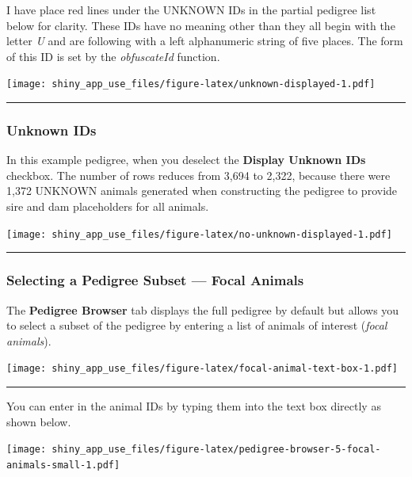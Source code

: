 \documentclass[
]{article}
\begin{document}
I have place red lines under the UNKNOWN IDs in the partial pedigree
list below for clarity. These IDs have no meaning other than they all
begin with the letter \emph{U} and are following with a left
alphanumeric string of five places. The form of this ID is set by the
\emph{obfuscateId} function.

\texttt{[image: shiny\_app\_use\_files/figure-latex/unknown-displayed-1.pdf]}

\begin{center}\rule{0.5\linewidth}{\linethickness}\end{center}

\hypertarget{unknown-ids}{%
\subsubsection{Unknown IDs}\label{unknown-ids}}

In this example pedigree, when you deselect the \textbf{Display Unknown
IDs} checkbox. The number of rows reduces from 3,694 to 2,322, because
there were 1,372 UNKNOWN animals generated when constructing the
pedigree to provide sire and dam placeholders for all animals.

\texttt{[image: shiny\_app\_use\_files/figure-latex/no-unknown-displayed-1.pdf]}

\begin{center}\rule{0.5\linewidth}{\linethickness}\end{center}

\hypertarget{selecting-a-pedigree-subset-focal-animals}{%
\subsubsection{Selecting a Pedigree Subset --- Focal
Animals}\label{selecting-a-pedigree-subset-focal-animals}}

The \textbf{Pedigree Browser} tab displays the full pedigree by default
but allows you to select a subset of the pedigree by entering a list of
animals of interest (\emph{focal animals}).

\texttt{[image: shiny\_app\_use\_files/figure-latex/focal-animal-text-box-1.pdf]}

\begin{center}\rule{0.5\linewidth}{\linethickness}\end{center}

You can enter in the animal IDs by typing them into the text box
directly as shown below.

\texttt{[image: shiny\_app\_use\_files/figure-latex/pedigree-browser-5-focal-animals-small-1.pdf]}
\end{document}
